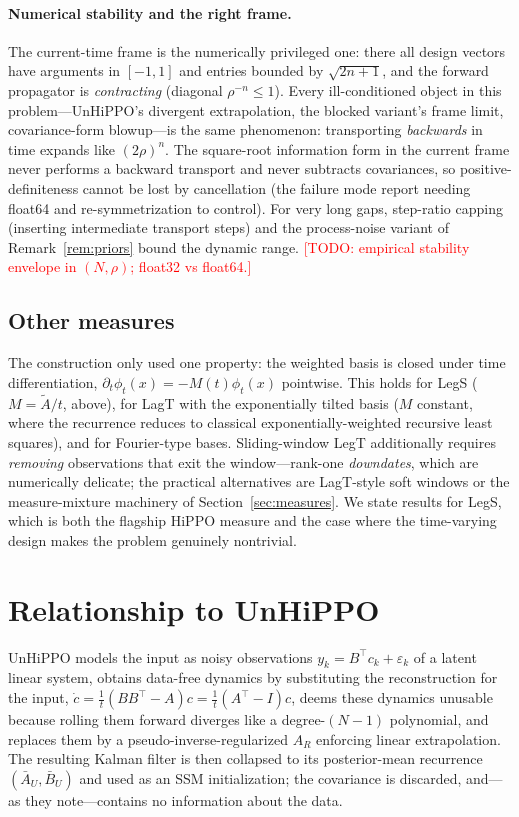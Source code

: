 \documentclass[11pt]{article}
\newcommand{\At}{\widetilde{A}}
\newcommand{\TODO}[1]{\textcolor{red}{[TODO: #1]}}
\begin{document}
\paragraph{Numerical stability and the right frame.} The current-time frame is the numerically privileged one: there all design vectors have arguments in $[-1,1]$ and entries bounded by $\sqrt{2n+1}$, and the forward propagator is \emph{contracting} (diagonal $\rho^{-n}\le1$). Every ill-conditioned object in this problem---UnHiPPO's divergent extrapolation, the blocked variant's frame limit, covariance-form blowup---is the same phenomenon: transporting \emph{backwards} in time expands like $(2\rho)^n$. The square-root information form in the current frame never performs a backward transport and never subtracts covariances, so positive-definiteness cannot be lost by cancellation (the failure mode \citet{lienen2025unhippo} report needing float64 and re-symmetrization to control). For very long gaps, step-ratio capping (inserting intermediate transport steps) and the process-noise variant of Remark~\ref{rem:priors} bound the dynamic range. \TODO{empirical stability envelope in $(N,\rho)$; float32 vs float64.}

\subsection{Other measures}

The construction only used one property: the weighted basis is closed under time differentiation, $\partial_t\phi_t(x)=-M(t)\phi_t(x)$ pointwise. This holds for LegS ($M=\At/t$, above), for LagT with the exponentially tilted basis ($M$ constant, where the recurrence reduces to classical exponentially-weighted recursive least squares), and for Fourier-type bases. Sliding-window LegT additionally requires \emph{removing} observations that exit the window---rank-one \emph{downdates}, which are numerically delicate; the practical alternatives are LagT-style soft windows or the measure-mixture machinery of Section~\ref{sec:measures}. We state results for LegS, which is both the flagship HiPPO measure and the case where the time-varying design makes the problem genuinely nontrivial.

\section{Relationship to UnHiPPO}\label{sec:unhippo}

UnHiPPO \citep{lienen2025unhippo} models the input as noisy observations $y_k=B^\top c_k+\varepsilon_k$ of a latent linear system, obtains data-free dynamics by substituting the reconstruction for the input, $\dot c=\tfrac1t(BB^\top-A)c=\tfrac1t(A^\top-I)c$, deems these dynamics unusable because rolling them forward diverges like a degree-$(N{-}1)$ polynomial, and replaces them by a pseudo-inverse-regularized $A_R$ enforcing linear extrapolation. The resulting Kalman filter is then collapsed to its posterior-mean recurrence $(\bar A_U,\bar B_U)$ and used as an SSM initialization; the covariance is discarded, and---as they note---contains no information about the data.
\end{document}
